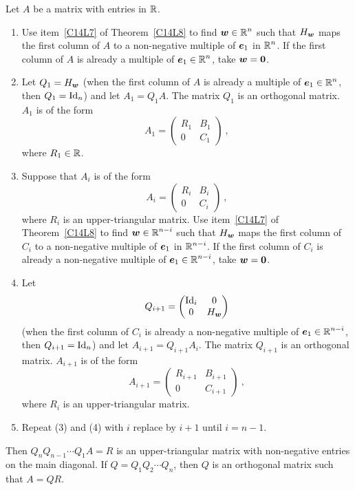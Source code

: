 \begin{algo}
Let $A$ be a  matrix with entries in $\mathbb{R}$.
\begin{enumerate}
\item  Use item~\ref{C14L7} of Theorem~\ref{C14L8} to find
$\displaystyle \bm{w} \in \mathbb{R}^n$ such that $H_{\bm{w}}$ maps the
first column of $A$ to a non-negative multiple of $\bm{e}_1$ in
$\displaystyle \mathbb{R}^n$.  If the first column of $A$
is already a multiple of $\displaystyle \bm{e}_1 \in \mathbb{R}^n$, take
$\bm{w}=\bm{0}$.
\item Let $Q_1 = H_{\bm{w}}$ (when the first column of $A$ is already a
multiple of $\displaystyle \bm{e}_1 \in \mathbb{R}^n$, then $Q_1 = \operatorname{Id}_n$) and let
$A_1 = Q_1 A$.
The matrix $Q_1$ is an orthogonal matrix.  $A_1$ is of the form
\[
A_1 = \begin{pmatrix}
R_1 & B_1 \\
0 & C_1
\end{pmatrix} \ ,
\]
where $R_1 \in \mathbb{R}$.
\item Suppose that $A_i$ is of the form
\[
A_i = \begin{pmatrix}
R_i & B_i \\
0 & C_i
\end{pmatrix} \ ,
\]
where $R_i$ is an  upper-triangular matrix.  Use item~\ref{C14L7}
of Theorem~\ref{C14L8} to find $\displaystyle \bm{w} \in \mathbb{R}^{n-i}$ such that
$H_{\bm{w}}$ maps the first column of $C_i$ to a non-negative multiple of
$\bm{e}_1$ in $\displaystyle \mathbb{R}^{n-i}$.  If the first column of
$C_i$ is already a non-negative multiple of
$\displaystyle \bm{e}_1 \in \mathbb{R}^{n-i}$, take $\bm{w} = \bm{0}$.
\item Let
\[
Q_{i+1} = \begin{pmatrix}
\operatorname{Id}_i & 0 \\
0 & H_{\bm{w}}
\end{pmatrix}
\]
(when the first column of $C_i$ is already a non-negative multiple of
$\displaystyle \bm{e}_1 \in \mathbb{R}^{n-i}$, then $Q_{i+1} = \operatorname{Id}_n$) and let
$A_{i+1} = Q_{i+1} A_i$.  The matrix $Q_{i+1}$ is an orthogonal matrix.
$A_{i+1}$ is of the form
\[
A_{i+1} = \begin{pmatrix}
R_{i+1} & B_{i+1} \\
0 & C_{i+1}
\end{pmatrix} \ ,
\]
where $R_i$ is an  upper-triangular matrix.
\item Repeat (3) and (4) with $i$ replace by $i+1$ until $i=n-1$.
\end{enumerate}
Then $Q_n Q_{n-1} \cdots Q_1 A = R$ is an upper-triangular matrix with
non-negative entries on the main diagonal.  If
$Q = Q_1 Q_2 \cdots Q_n$, then $Q$ is an orthogonal matrix such that
$A = Q R$.
\label{C14L9}
\end{algo}

